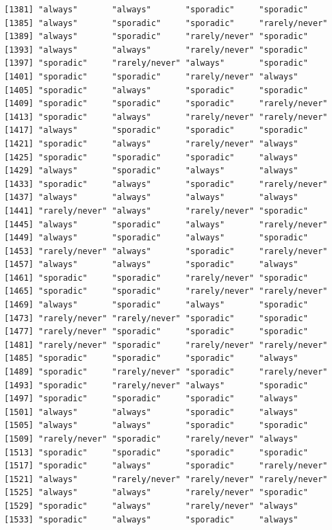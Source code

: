 \documentclass[
  letterpaper,
  DIV=11,
  numbers=noendperiod]{scrartcl}
\begin{document}
\begin{verbatim}
[1381] "always"       "always"       "sporadic"     "sporadic"    
[1385] "always"       "sporadic"     "sporadic"     "rarely/never"
[1389] "always"       "sporadic"     "rarely/never" "sporadic"    
[1393] "always"       "always"       "rarely/never" "sporadic"    
[1397] "sporadic"     "rarely/never" "always"       "sporadic"    
[1401] "sporadic"     "sporadic"     "rarely/never" "always"      
[1405] "sporadic"     "always"       "sporadic"     "sporadic"    
[1409] "sporadic"     "sporadic"     "sporadic"     "rarely/never"
[1413] "sporadic"     "always"       "rarely/never" "rarely/never"
[1417] "always"       "sporadic"     "sporadic"     "sporadic"    
[1421] "sporadic"     "always"       "rarely/never" "always"      
[1425] "sporadic"     "sporadic"     "sporadic"     "always"      
[1429] "always"       "sporadic"     "always"       "always"      
[1433] "sporadic"     "always"       "sporadic"     "rarely/never"
[1437] "always"       "always"       "always"       "always"      
[1441] "rarely/never" "always"       "rarely/never" "sporadic"    
[1445] "always"       "sporadic"     "always"       "rarely/never"
[1449] "always"       "sporadic"     "always"       "sporadic"    
[1453] "rarely/never" "always"       "sporadic"     "rarely/never"
[1457] "always"       "always"       "sporadic"     "always"      
[1461] "sporadic"     "sporadic"     "rarely/never" "sporadic"    
[1465] "sporadic"     "sporadic"     "rarely/never" "rarely/never"
[1469] "always"       "sporadic"     "always"       "sporadic"    
[1473] "rarely/never" "rarely/never" "sporadic"     "sporadic"    
[1477] "rarely/never" "sporadic"     "sporadic"     "sporadic"    
[1481] "rarely/never" "sporadic"     "rarely/never" "rarely/never"
[1485] "sporadic"     "sporadic"     "sporadic"     "always"      
[1489] "sporadic"     "rarely/never" "sporadic"     "rarely/never"
[1493] "sporadic"     "rarely/never" "always"       "sporadic"    
[1497] "sporadic"     "sporadic"     "sporadic"     "always"      
[1501] "always"       "always"       "sporadic"     "always"      
[1505] "always"       "always"       "sporadic"     "sporadic"    
[1509] "rarely/never" "sporadic"     "rarely/never" "always"      
[1513] "sporadic"     "sporadic"     "sporadic"     "sporadic"    
[1517] "sporadic"     "always"       "sporadic"     "rarely/never"
[1521] "always"       "rarely/never" "rarely/never" "rarely/never"
[1525] "always"       "always"       "rarely/never" "sporadic"    
[1529] "sporadic"     "always"       "rarely/never" "always"      
[1533] "sporadic"     "always"       "sporadic"     "always"      

\end{verbatim}
\end{document}
